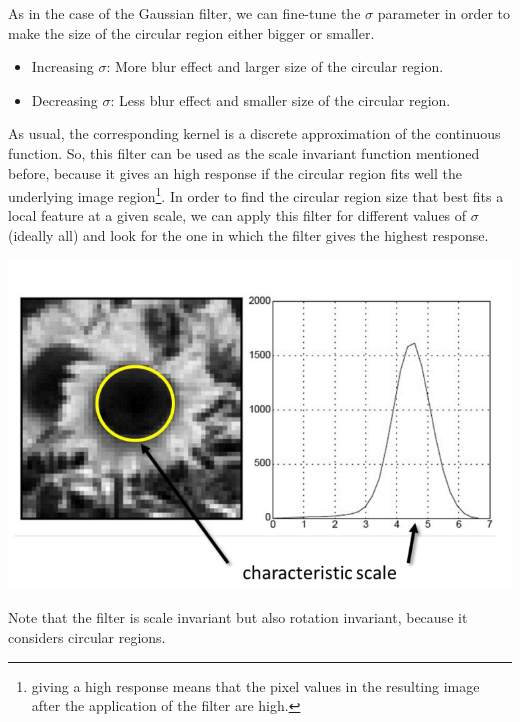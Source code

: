 As in the case of the Gaussian filter, we can fine-tune the $\sigma$ parameter in order to make the size of the circular region either bigger or smaller.
\begin{itemize}
    \item Increasing $\sigma$: More blur effect and larger size of the circular region.
    \item Decreasing $\sigma$: Less blur effect and smaller size of the circular region.
\end{itemize}
As usual, the corresponding kernel is a discrete approximation of the continuous function. \newline\newline
So, this filter can be used as the scale invariant function mentioned before, because it gives an high response if the circular region fits well the underlying image region\footnote{giving a high response means that the pixel values in the resulting image after the application of the filter are high.}. In order to find the circular region size that best fits a local feature at a given scale, we can apply this filter for different values of $\sigma$ (ideally all) and look for the one in which the filter gives the highest response.
\begin{center}
    \includegraphics[scale = 0.8]{images/LoG scales.png}
\end{center}
Note that the filter is scale invariant but also rotation invariant, because it considers circular regions.

